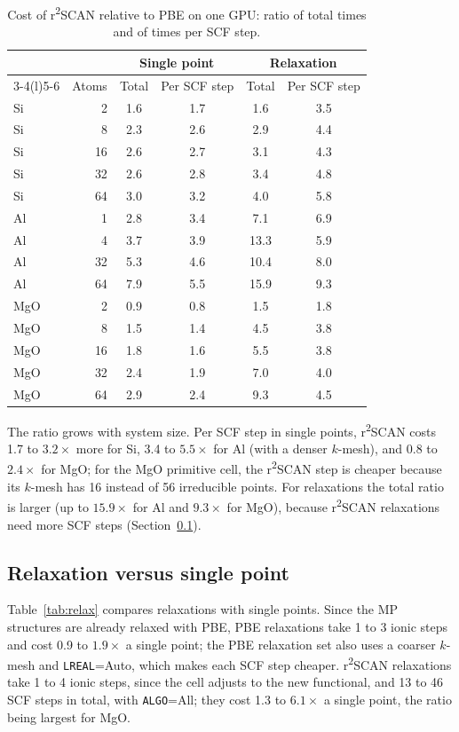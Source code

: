 \documentclass[11pt,letterpaper]{article}
\begin{document}
\begin{table}[htbp]
\centering
\caption{Cost of r\textsuperscript{2}SCAN relative to PBE on one GPU: ratio of total times and
of times per SCF step.}
\label{tab:r2}
\small
\begin{tabular}{@{}lr cc cc@{}}
\toprule
 & & \multicolumn{2}{c}{Single point} & \multicolumn{2}{c}{Relaxation} \\
\cmidrule(lr){3-4}\cmidrule(l){5-6}
 & Atoms & Total & Per SCF step & Total & Per SCF step \\
\midrule
Si & 2 & 1.6 & 1.7 & 1.6 & 3.5 \\
Si & 8 & 2.3 & 2.6 & 2.9 & 4.4 \\
Si & 16 & 2.6 & 2.7 & 3.1 & 4.3 \\
Si & 32 & 2.6 & 2.8 & 3.4 & 4.8 \\
Si & 64 & 3.0 & 3.2 & 4.0 & 5.8 \\
\addlinespace
Al & 1 & 2.8 & 3.4 & 7.1 & 6.9 \\
Al & 4 & 3.7 & 3.9 & 13.3 & 5.9 \\
Al & 32 & 5.3 & 4.6 & 10.4 & 8.0 \\
Al & 64 & 7.9 & 5.5 & 15.9 & 9.3 \\
\addlinespace
MgO & 2 & 0.9 & 0.8 & 1.5 & 1.8 \\
MgO & 8 & 1.5 & 1.4 & 4.5 & 3.8 \\
MgO & 16 & 1.8 & 1.6 & 5.5 & 3.8 \\
MgO & 32 & 2.4 & 1.9 & 7.0 & 4.0 \\
MgO & 64 & 2.9 & 2.4 & 9.3 & 4.5 \\
\bottomrule
\end{tabular}
\end{table}

The ratio grows with system size. Per SCF step in single points, r\textsuperscript{2}SCAN costs 1.7 to $3.2\times$
more for Si, 3.4 to $5.5\times$ for Al (with a denser $k$-mesh), and 0.8 to $2.4\times$ for
MgO; for the MgO primitive cell, the r\textsuperscript{2}SCAN step is cheaper because its
$k$-mesh has 16 instead of 56 irreducible points. For relaxations the total ratio is larger
(up to $15.9\times$ for Al and $9.3\times$ for MgO), because r\textsuperscript{2}SCAN
relaxations need more SCF steps (Section~\ref{sec:res-relax}).

\subsection{Relaxation versus single point}
\label{sec:res-relax}
Table~\ref{tab:relax} compares relaxations with single points. Since the MP structures are
already relaxed with PBE, PBE relaxations take 1 to 3 ionic steps and cost 0.9 to $1.9\times$ a
single point; the PBE relaxation set also uses a coarser $k$-mesh and \texttt{LREAL}=Auto, which
makes each SCF step cheaper. r\textsuperscript{2}SCAN relaxations take 1 to 4 ionic steps,
since the cell adjusts to the new functional, and 13 to 46 SCF steps in total, with
\texttt{ALGO}=All; they cost 1.3 to $6.1\times$ a single point, the ratio being largest for
MgO.
\end{document}
